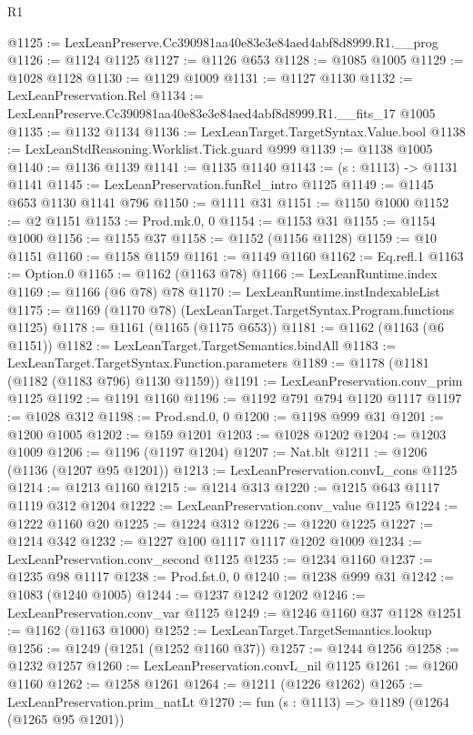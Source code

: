 \begin{lexlean}{R1}
\begin{coremodule}
@1125 := LexLeanPreserve.Cc390981aa40e83e3e84aed4abf8d8999.R1.__prog
@1126 := @1124 @1125
@1127 := @1126 @653
@1128 := @1085 @1005
@1129 := @1028 @1128
@1130 := @1129 @1009
@1131 := @1127 @1130
@1132 := LexLeanPreservation.Rel
@1134 := LexLeanPreserve.Cc390981aa40e83e3e84aed4abf8d8999.R1.__fits_17 @1005
@1135 := @1132 @1134
@1136 := LexLeanTarget.TargetSyntax.Value.bool
@1138 := LexLeanStdReasoning.Worklist.Tick.guard @999
@1139 := @1138 @1005
@1140 := @1136 @1139
@1141 := @1135 @1140
@1143 := (s : @1113) -> @1131 @1141
@1145 := LexLeanPreservation.funRel_intro @1125
@1149 := @1145 @653 @1130 @1141 @796
@1150 := @1111 @31
@1151 := @1150 @1000
@1152 := @2 @1151
@1153 := Prod.mk.{0, 0}
@1154 := @1153 @31
@1155 := @1154 @1000
@1156 := @1155 @37
@1158 := @1152 (@1156 @1128)
@1159 := @10 @1151
@1160 := @1158 @1159
@1161 := @1149 @1160
@1162 := Eq.refl.{1}
@1163 := Option.{0}
@1165 := @1162 (@1163 @78)
@1166 := LexLeanRuntime.index
@1169 := @1166 (@6 @78) @78
@1170 := LexLeanRuntime.instIndexableList
@1175 := @1169 (@1170 @78) (LexLeanTarget.TargetSyntax.Program.functions @1125)
@1178 := @1161 (@1165 (@1175 @653))
@1181 := @1162 (@1163 (@6 @1151))
@1182 := LexLeanTarget.TargetSemantics.bindAll
@1183 := LexLeanTarget.TargetSyntax.Function.parameters
@1189 := @1178 (@1181 (@1182 (@1183 @796) @1130 @1159))
@1191 := LexLeanPreservation.conv_prim @1125
@1192 := @1191 @1160
@1196 := @1192 @791 @794 @1120 @1117
@1197 := @1028 @312
@1198 := Prod.snd.{0, 0}
@1200 := @1198 @999 @31
@1201 := @1200 @1005
@1202 := @159 @1201
@1203 := @1028 @1202
@1204 := @1203 @1009
@1206 := @1196 (@1197 @1204)
@1207 := Nat.blt
@1211 := @1206 (@1136 (@1207 @95 @1201))
@1213 := LexLeanPreservation.convL_cons @1125
@1214 := @1213 @1160
@1215 := @1214 @313
@1220 := @1215 @643 @1117 @1119 @312 @1204
@1222 := LexLeanPreservation.conv_value @1125
@1224 := @1222 @1160 @20
@1225 := @1224 @312
@1226 := @1220 @1225
@1227 := @1214 @342
@1232 := @1227 @100 @1117 @1117 @1202 @1009
@1234 := LexLeanPreservation.conv_second @1125
@1235 := @1234 @1160
@1237 := @1235 @98 @1117
@1238 := Prod.fst.{0, 0}
@1240 := @1238 @999 @31
@1242 := @1083 (@1240 @1005)
@1244 := @1237 @1242 @1202
@1246 := LexLeanPreservation.conv_var @1125
@1249 := @1246 @1160 @37 @1128
@1251 := @1162 (@1163 @1000)
@1252 := LexLeanTarget.TargetSemantics.lookup
@1256 := @1249 (@1251 (@1252 @1160 @37))
@1257 := @1244 @1256
@1258 := @1232 @1257
@1260 := LexLeanPreservation.convL_nil @1125
@1261 := @1260 @1160
@1262 := @1258 @1261
@1264 := @1211 (@1226 @1262)
@1265 := LexLeanPreservation.prim_natLt
@1270 := fun (s : @1113) => @1189 (@1264 (@1265 @95 @1201))

\end{coremodule}
\end{lexlean}
